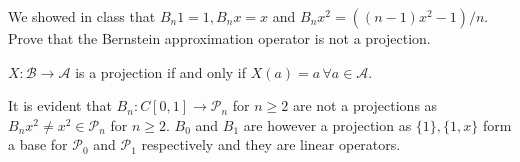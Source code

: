 \begin{problem}
  We showed in class that $B_n 1 = 1, B_n x = x $ and $B_n x^2 = ((n -
  1)x^2 - 1 ) /n$. Prove that the Bernstein approximation operator is
  not a projection.
\end{problem}

\begin{solution}
  $X: \mathcal{B} \rightarrow \mathcal{A}$ is a projection if and only
  if $X(a) = a \, \forall a \in \mathcal{A}$.

  It is evident that $B_n:C[0,1] \rightarrow \mathcal{P}_n$ for
  $n \geq 2$ are not a projections as
  $B_n x^2 \neq x^2 \in \mathcal{P}_n$ for $n \geq 2$. $B_0$ and $B_1$
  are however a projection as $\{1\}, \{1, x\}$ form a base for
  $\mathcal{P}_0$ and $\mathcal{P}_1$ respectively and they are
  linear operators.
\end{solution}


